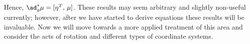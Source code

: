 Hence, $\ad_g^*\mu = [\eta^T,\,\mu]$. These results may seem arbitrary and slightly non-useful currently; however, after we have started to derive equations these results will be invaluable. Now we will move towards a more applied treatment of this area and consider the acts of rotation and different types of coordinate systems.

